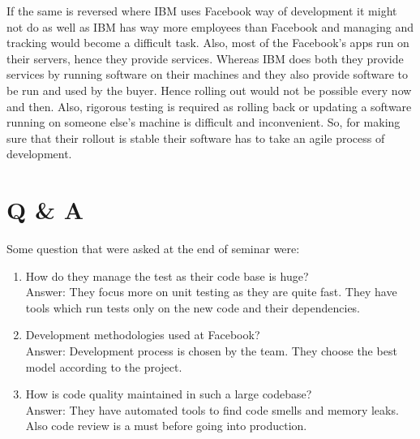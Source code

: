 \documentclass[10pt]{article}
\begin{document}
If the same is reversed where IBM uses Facebook way of development it might not do as well as IBM has way more employees than Facebook and managing and tracking would become a difficult task. Also, most of the Facebook's apps run on their servers, hence they provide services. Whereas IBM does both they provide services by running software on their machines and they also provide software to be run and used by the buyer. Hence rolling out would not be possible every now and then. Also, rigorous testing is required as rolling back or updating a software running on someone else's machine is difficult and inconvenient. So, for making sure that their rollout is stable their software has to take an agile process of development.

\section{Q \& A}

Some question that were asked at the end of seminar were:

\begin{enumerate}
    \item How do they manage the test as their code base is huge? \\
          Answer: They focus more on unit testing as they are quite fast. They have tools which run tests only on the new code and their dependencies.
    \item Development methodologies used at Facebook? \\
          Answer: Development process is chosen by the team. They choose the best model according to the project.
    \item How is code quality maintained in such a large codebase? \\
          Answer:  They have automated tools to find code smells and memory leaks. Also code review is a must before going into production.
\end{enumerate}
\end{document}
